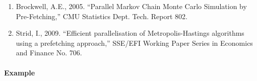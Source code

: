\begin{enumerate}
\def\labelenumi{\arabic{enumi}.}
\item
  Brockwell, A.E., 2005. ``Parallel Markov Chain Monte Carlo Simulation
  by Pre-Fetching,'' CMU Statistics Dept. Tech. Report 802.
\item
  Strid, I., 2009. ``Efficient parallelisation of Metropolis-Hastings
  algorithms using a prefetching approach,'' SSE/EFI Working Paper
  Series in Economics and Finance No. 706.
\end{enumerate}

\paragraph{Example}


